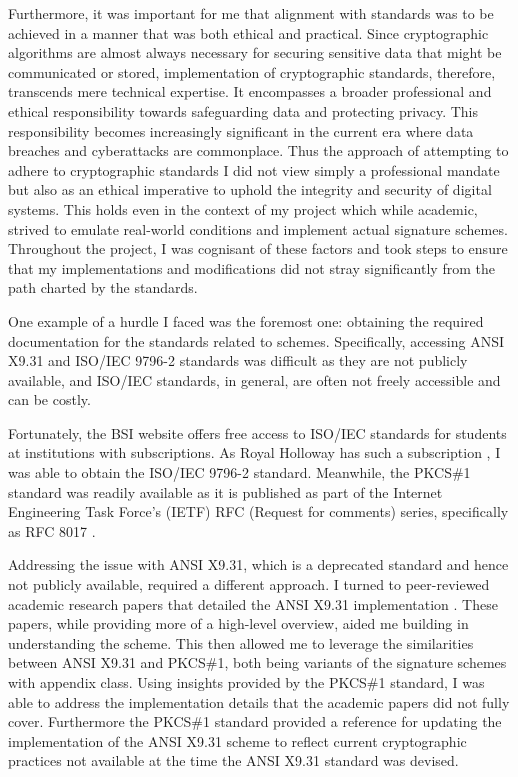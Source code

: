 \documentclass[]{final_report}
\theoremstyle{definition}
\begin{document}
Furthermore, it was important for me that alignment with standards was to be achieved in a manner that was both ethical and practical. Since cryptographic algorithms are almost always necessary for securing sensitive data that might be communicated or stored, implementation of cryptographic standards, therefore, transcends mere technical expertise. It encompasses a broader professional and ethical responsibility towards safeguarding data and protecting privacy. This responsibility becomes increasingly significant in the current era where data breaches and cyberattacks are commonplace. Thus the approach of attempting to adhere to cryptographic standards I did not view simply a professional mandate but also as an ethical imperative to uphold the integrity and security of digital systems. This holds even in the context of my project which while academic, strived to emulate real-world conditions and implement actual signature schemes.
Throughout the project, I was cognisant of these factors and took steps to ensure that my implementations and modifications did not stray significantly from the path charted by the standards.

One example of a hurdle I faced was the foremost one: obtaining the required documentation for the standards related to schemes. Specifically, accessing ANSI X9.31 and ISO/IEC 9796-2 standards was difficult as they are not publicly available, and ISO/IEC standards, in general, are often not freely accessible and can be costly.

Fortunately, the BSI website offers free access to ISO/IEC standards for students at institutions with subscriptions. As Royal Holloway has such a subscription \cite{BSIWebsite}, I was able to obtain the ISO/IEC 9796-2 standard. Meanwhile, the PKCS\#1 standard was readily available as it is published as part of the Internet Engineering Task Force's (IETF) RFC (Request for comments) series, specifically as RFC 8017 \cite{rfc8017}.

Addressing the issue with ANSI X9.31, which is a deprecated standard and hence not publicly available, required a different approach. I turned to peer-reviewed academic research papers that detailed the ANSI X9.31 implementation \cite{10.1007/978-3-030-64357-7_5}. These papers, while providing more of a high-level overview, aided me building in understanding the scheme. This then allowed me to leverage the similarities between ANSI X9.31 and PKCS\#1, both being variants of the signature schemes with appendix class. Using insights provided by the PKCS\#1 standard, I was able to address the implementation details that the academic papers did not fully cover. Furthermore the PKCS\#1 standard provided a reference for updating the implementation of the ANSI X9.31 scheme to reflect current cryptographic practices not available at the time the ANSI X9.31 standard was devised. 
\end{document}
